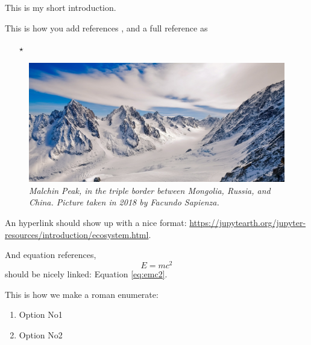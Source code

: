 This is my short introduction.

\vspace{10px}
\noindent This is how you add references \cite{jupyterbook}, and a full reference as
\begin{enumerate}
    \item[$\star$] 
\end{enumerate}

\begin{figure}
\captionsetup{justification=centering, singlelinecheck=off}
\begin{center}
\includegraphics[width=\columnwidth]{figures/malchin.jpg}
\caption*{\textit{Malchin Peak, in the triple border between Mongolia, Russia, and China. Picture taken in 2018 by Facundo Sapienza.}}
\end{center}
\end{figure} 

\vspace{10px}
\noindent An hyperlink should show up with a nice format: \url{https://jupytearth.org/jupyter-resources/introduction/ecosystem.html}.

\vspace{10px}
\noindent And equation references, 
\begin{equation}
    E = mc^2
    \label{eq:emc2}
\end{equation}
should be nicely linked: Equation \eqref{eq:emc2}.

\vspace{10px}
\noindent This is how we make a roman enumerate:
\begin{enumerate}[label=(\roman*)]
    \item Option No1
    \item Option No2 
\end{enumerate}